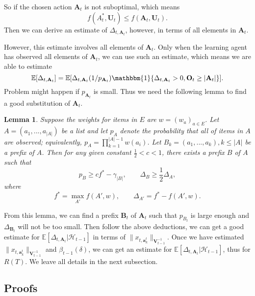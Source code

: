 \documentclass{article}
\newcommand{\EE}{\mathbb{E}}
\newcommand{\bOne}{\mathbbm{1}}
\newcommand{\bA}{\mathbf{A}}
\newcommand{\ba}{\mathbf{a}}
\newcommand{\bB}{\mathbf{B}}
\newcommand{\bO}{\mathbf{O}}
\newcommand{\bU}{\mathbf{U}}
\newcommand{\bV}{\mathbf{V}}
\newcommand{\cH}{\mathcal{H}}
\newcommand{\abs}[1]{\left| #1 \right|}
\newcommand{\norm}[1]{\| #1 \|}
\newtheorem{lemma}[theorem]{Lemma}%
\begin{document}
So if the chosen action $\bA_t$ is not suboptimal, which means
$$
f(A_t^*, \bU_t) \leq f(\bA_t, \bU_t).
$$
Then we can derive an estimate of $\Delta_{t, \bA_t}$, however, in terms of all elements in $\bA_t$. 

However, this estimate involves all elements of $\bA_t$. Only when the learning agent has observed all elements of $\bA_t$, we can use such an estimate, which means we are able to estimate
$$
\EE[\Delta_{t, \bA_t}] = \EE[\Delta_{t, \bA_t}(1/p_{\bA_t}) \bOne\{\Delta_{t, \bA_t} > 0, \bO_t \geq \abs{\bA_t}\}].
$$
Problem might happen if $p_{\bA_t}$ is small. Thus we need the following lemma to find a good substitution of $\bA_t$.

\begin{lemma}
\label{lem:prefixExist}
Suppose the weights for items in $E$ are $w = (w_a)_{a \in E}$. Let $A = (a_1, ..., a_{\abs{A}})$ be a list and let $p_A$ denote the probability that all of items in $A$ are observed; equivalently, $p_A = \prod_{k=1}^{\abs{A}-1}w(a_i)$. Let $B_k = (a_1, ..., a_k), k \leq \abs{A}$ be a prefix of $A$. Then for any given constant $\frac{1}{2} < c < 1$, there exists a prefix $B$ of $A$ such that
$$
p_B \geq c f^* - \gamma_{\abs{B}}, \qquad \Delta_B \geq \frac{1}{2} \Delta_A,
$$
where
$$
f^* = \max_{A'} f(A', w), \qquad \Delta_{A'} = f^* - f(A', w).
$$
\end{lemma}

From this lemma, we can find a prefix $\bB_t$ of $\bA_t$ such that $p_{B_t}$ is large enough and $\Delta_{\bB_t}$ will not be too small. Then follow the above deductions, we can get a good estimate for $\EE[\Delta_{t, \bA_t}|\cH_{t-1}]$ in terms of $\norm{x_{t,\ba_k^t}}_{\bV_{t-1}^{-1}}$. Once we have estimated $\norm{x_{t,\ba_k^t}}_{\bV_{t-1}^{-1}}$ and $\beta_{t-1}(\delta)$, we can get an estimate for $\EE[\Delta_{t, \bA_t}|\cH_{t-1}]$, thus for $R(T)$. We leave all details in the next subsection.


\subsection{Proofs}
\end{document}
